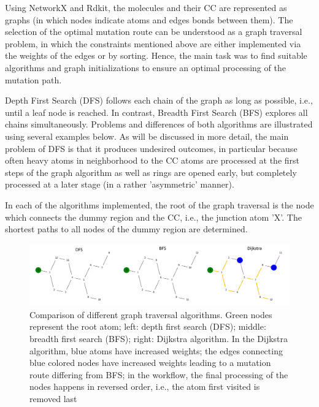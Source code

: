 Using NetworkX and Rdkit, the molecules and their CC are
represented as graphs (in which nodes indicate atoms and edges bonds
between them). The selection of the optimal mutation route can be
understood as a graph traversal problem, in which the constraints mentioned
above are either implemented via the weights of the edges or by sorting.
Hence, the main task was to find suitable algorithms and graph initializations
to ensure an optimal processing of the mutation path.

Depth First Search (DFS) follows each chain of the graph as long as
possible, i.e., until a leaf node is reached. In contrast, Breadth
First Search (BFS) explores all chains simultaneously.\cite{Even.2012}
Problems and differences of both algorithms are illustrated using
several examples below. As will be discussed in more detail, the main problem of DFS is that it produces undesired outcomes, in particular because often heavy atoms in neighborhood to the CC atoms are processed at the first steps of the graph algorithm as well as rings are opened early, but completely processed at a later stage (in a rather 'asymmetric' manner).   

In each of the algorithms implemented, the root of the graph traversal is the node which connects the dummy region and the CC, i.e., the junction atom 'X'.
The shortest paths to all nodes of the dummy region are determined.

\begin{figure}

\includegraphics[scale=0.455]{dfs_bfs_dijkstra_comp1_v3.png}\caption{Comparison of different graph traversal algorithms. Green nodes represent the root atom; left: depth first
search (DFS); middle: breadth first search (BFS); right: Dijkstra algorithm. In the Dijkstra algorithm, blue atoms have increased weights;  the
edges connecting blue colored nodes have increased weights leading
to a mutation route differing from BFS; in the \trafo workflow, the final processing of the
nodes happens in reversed order, i.e., the atom first visited is removed last}

\end{figure}

